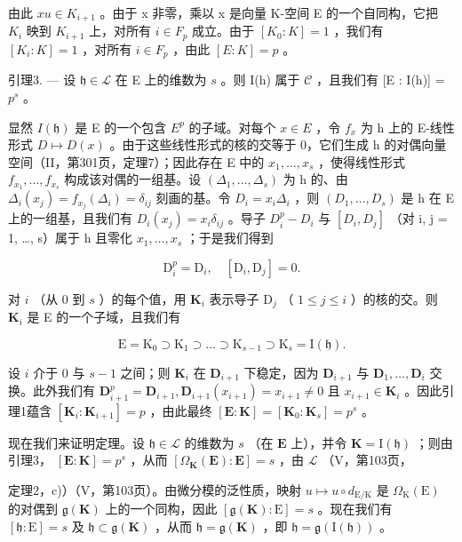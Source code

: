 由此 \(xu \in K_{i+1}\) 。由于 x 非零，乘以 x 是向量 K-空间 E 的一个自同构，它把 \(K_i\) 映到 \(K_{i+1}\) 上，对所有 \(i \in F_p\) 成立。由于 \([K_0 : K] = 1\) ，我们有 \([K_i : K] = 1\) ，对所有 \(i \in F_p\) ，由此 \([E : K] = p\) 。

引理3. --- 设 \(\mathfrak{h} \in \mathcal{L}\) 在 E 上的维数为 \(s\) 。则 I(h) 属于 \(\mathcal{C}\) ，且我们有 {[}E : I(h){]} = \(p^s\) 。

显然 \(I(\mathfrak{h})\) 是 E 的一个包含 \(E^{p}\) 的子域。对每个 \(x \in E\) ，令 \(f_{x}\) 为 h 上的 E-线性形式 \(D \mapsto D(x)\) 。由于这些线性形式的核的交等于 0，它们生成 h 的对偶向量空间（II，第301页，定理7）；因此存在 E 中的 \(x_{1}, \ldots, x_{s}\) ，使得线性形式 \(f_{x_{1}}, \ldots, f_{x_{s}}\) 构成该对偶的一组基。设 \((\Delta_{1}, \ldots, \Delta_{s})\) 为 h 的、由 \(\Delta_{i}(x_{j}) = f_{x_{j}}(\Delta_{i}) = \delta_{ij}\) 刻画的基。令 \(D_{i} = x_{i}\Delta_{i}\) ，则 \((D_{1}, \ldots, D_{s})\) 是 h 在 E 上的一组基，且我们有 \(D_{i}(x_{j}) = x_{i}\delta_{ij}\) 。导子 \(D_{i}^{p} - D_{i}\) 与 \([D_{i}, D_{j}]\) （对 i, j = 1, \ldots, s）属于 h 且零化 \(x_{1}, \ldots, x_{s}\) ；于是我们得到

\[
\mathrm{D} _ {i} ^ {p} = \mathrm{D} _ {i}, \quad [ \mathrm{D} _ {i}, \mathrm{D} _ {j} ] = 0.\tag{10}
\]

对 \(i\) （从 0 到 \(s\) ）的每个值，用 \(\mathbf{K}_i\) 表示导子 \(\mathrm{D}_j\) （ \(1 \leqslant j \leqslant i\) ）的核的交。则 \(\mathbf{K}_i\) 是 E 的一个子域，且我们有

\[
\mathrm{E} = {\mathrm{K}} _ {0} \supset \mathrm{K} _ {1} \supset \dots \supset \mathrm{K} _ {s - 1} \supset \mathrm{K} _ {s} = \mathrm{I} (\mathfrak {h}).
\]

设 \(i\) 介于 0 与 \(s-1\) 之间；则 \(\mathbf{K}_{i}\) 在 \(\mathbf{D}_{i+1}\) 下稳定，因为 \(\mathbf{D}_{i+1}\) 与 \(\mathbf{D}_{1}, \ldots, \mathbf{D}_{i}\) 交换。此外我们有 \(\mathbf{D}_{i+1}^{p} = \mathbf{D}_{i+1}, \mathbf{D}_{i+1}(x_{i+1}) = x_{i+1} \neq 0\) 且 \(x_{i+1} \in \mathbf{K}_{i}\) 。因此引理1蕴含 \([\mathbf{K}_{i}: \mathbf{K}_{i+1}] = p\) ，由此最终 \([\mathbf{E}: \mathbf{K}] = [\mathbf{K}_{0}: \mathbf{K}_{s}] = p^{s}\) 。

现在我们来证明定理。设 \(\mathfrak{h} \in \mathcal{L}\) 的维数为 \(s\) （在 \(\mathbf{E}\) 上），并令 \(\mathbf{K} = \mathrm{I}(\mathfrak{h})\) ；则由引理3， \([\mathbf{E}:\mathbf{K}] = p^s\) ，从而 \([\Omega_{\mathbf{K}}(\mathbf{E}):\mathbf{E}] = s\) ，由 \(\mathcal{L}\) （V，第103页，

定理2，c)）（V，第103页）。由微分模的泛性质，映射 \(u \mapsto u \circ d_{\mathrm{E} / \mathrm{K}}\) 是 \(\Omega_{\mathrm{K}}(\mathrm{E})\) 的对偶到 \(\mathfrak{g}(\mathbf{K})\) 上的一个同构，因此 \([\mathfrak{g}(\mathbf{K}) : \mathrm{E}] = s\) 。现在我们有 \([\mathfrak{h} : \mathrm{E}] = s\) 及 \(\mathfrak{h} \subset \mathfrak{g}(\mathbf{K})\) ，从而 \(\mathfrak{h} = \mathfrak{g}(\mathbf{K})\) ，即 \(\mathfrak{h} = \mathfrak{g}(\mathrm{I}(\mathfrak{h}))\) 。

